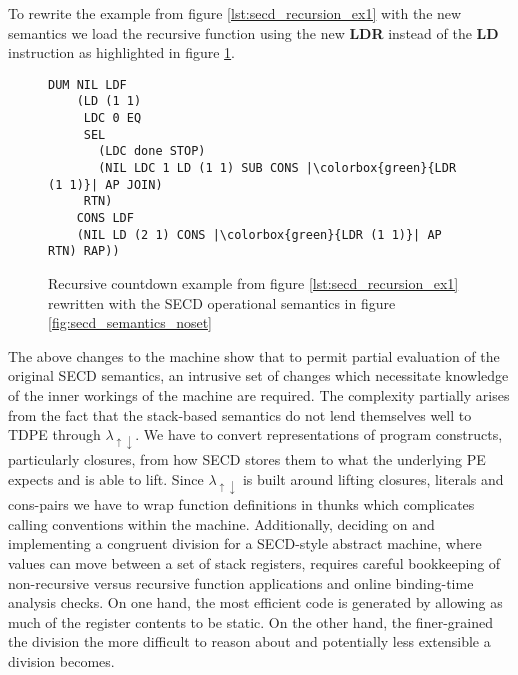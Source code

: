 \documentclass[a4paper,12pt,twoside,openright]{report}
\theoremstyle{definition}
\newcommand{\mslang}{$\lambda_{\uparrow\downarrow}$}
\begin{document}
To rewrite the example from figure \ref{lst:secd_recursion_ex1} with the new semantics we load the recursive function using the new \textbf{LDR} instead of the \textbf{LD} instruction as highlighted in figure \ref{lst:secd_recursion_ex1_newsem}.

\begin{figure}[ht]
\begin{verbatim}
DUM NIL LDF
    (LD (1 1)
     LDC 0 EQ
     SEL
       (LDC done STOP)
       (NIL LDC 1 LD (1 1) SUB CONS |\colorbox{green}{LDR (1 1)}| AP JOIN)
     RTN)
    CONS LDF
    (NIL LD (2 1) CONS |\colorbox{green}{LDR (1 1)}| AP RTN) RAP))
\end{verbatim}
\caption{Recursive countdown example from figure \ref{lst:secd_recursion_ex1} rewritten with the SECD operational semantics in figure \ref{fig:secd_semantics_noset}}
\label{lst:secd_recursion_ex1_newsem}
\end{figure}

The above changes to the machine show that to permit partial evaluation of the original SECD semantics, an intrusive set of changes which necessitate knowledge of the inner workings of the machine are required. The complexity partially arises from the fact that the stack-based semantics do not lend themselves well to TDPE through \mslang. We have to convert representations of program constructs, particularly closures, from how SECD stores them to what the underlying PE expects and is able to lift. Since \mslang{} is built around lifting closures, literals and cons-pairs we have to wrap function definitions in thunks which complicates calling conventions within the machine. Additionally, deciding on and implementing a congruent division for a SECD-style abstract machine, where values can move between a set of stack registers, requires careful bookkeeping of non-recursive versus recursive function applications and online binding-time analysis checks. On one hand, the most efficient code is generated by allowing as much of the register contents to be static. On the other hand, the finer-grained the division the more difficult to reason about and potentially less extensible a division becomes.
\end{document}
